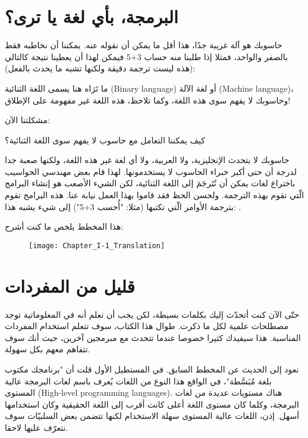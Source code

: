 \section{البرمجة، بأي لغة يا ترى؟}

حاسوبك هو آلة غريبة جدًا، هذا أقل ما يمكن أن نقوله عنه. يمكننا أن نخاطبه فقط بالصفر والواحد، فمثلا إذا طلبنا منه حساب 3+5 فيمكن لهذا أن يعطينا نتيجة كالتالي (هذه ليست ترجمة دقيقة ولكنها تشبه ما يحدث بالفعل):

ما تَرَاه هنا يسمى اللغة الثنائية
(\textenglish{Binary language})
أو لغة الآلة
(\textenglish{Machine language})،
وحاسوبك لا يفهم سوى هذه اللغة، وكما تلاحظ، هذه اللغة غير مفهومة على الإطلاق!

مشكلتنا الآن:

\begin{question}
  كيف يمكننا التعامل مع حاسوب لا يفهم سوى اللغة الثنائية؟
\end{question}

حاسوبك لا يتحدث الإنجليزية، ولا العربية، ولا أي لغة غير هذه اللغة، ولكنها صعبة جدا لدرجة أن حتى أكبر خبراء الحاسوب لا يستخدمونها.
لهذا قام بعض مهندسي الحواسيب باختراع لغات يمكن أن تُتَرجَمَ إلى اللغة الثنائية، لكن الشيء الأصعب هو إنشاء البرامج الّتي تقوم بهذه الترجمة. ولحسن الحظ فقد قاموا بهذا العمل نيابة عنا. هذه البرامج تقوم بترجمة الأوامر الّتي تكتبها (مثلا: "أُحسب 3+5") إلى شيء يشبه هذا:
.

هذا المخطط يلخص ما كنت أشرح:

\begin{figure}[H]
	\centering
	\texttt{[image: Chapter\_I-1\_Translation]}
\end{figure}

\section{قليل من المفردات}

حتّى الآن كنت أتحدّث إليك بكلمات بسيطة، لكن يجب أن تعلم أنه في المعلوماتية توجد مصطلحات علمية لكل ما ذكرت. طوال هذا الكتاب، سوف تتعلم استخدام المفردات المناسبة. هذا سيفيدك كثيرا خصوصا عندما تتحدث مع مبرمجين آخرين، حيث أنك سوف تتفاهم معهم بكل سهولة.

نعود إلى الحديث عن المخطط السابق. في المستطيل الأول قلت أن "برنامجك مكتوب بلغة مُبَسَّطة"، في الواقع هذا النوع من اللغات يُعرف باسم لغات البرمجة عالية المستوى (\textenglish{High-level programming languages}). هناك مستويات عديدة من لغات البرمجة، وكلما كان مستوى اللغة أعلى كانت أقرب إلى اللغة الحقيقية وكان استخدامها أسهل. إذن، اللغات عالية المستوى سهلة الاستخدام لكنها تتضمن بعض السلبيّات سوف نتعرّف عليها لاحقا.

